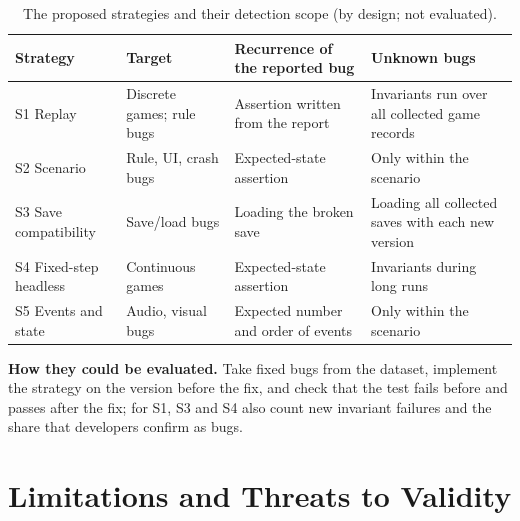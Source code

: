 \documentclass[10pt,twocolumn,a4paper]{article}
\newcommand{\para}[1]{\par\smallskip\noindent\textbf{#1}\enspace}
\begin{document}
\begin{table}[tb]
\centering
\caption{The proposed strategies and their detection scope (by design; not evaluated).}\label{tab:detect}
\small
\begin{tabularx}{\textwidth}{@{}P{34mm}P{30mm}LL@{}}
\toprule
Strategy & Target & Recurrence of the reported bug & Unknown bugs\\
\midrule
S1 Replay & Discrete games; rule bugs & Assertion written from the report & Invariants run over all collected game records\\
S2 Scenario & Rule, UI, crash bugs & Expected-state assertion & Only within the scenario\\
S3 Save compatibility & Save/load bugs & Loading the broken save & Loading all collected saves with each new version\\
S4 Fixed-step headless & Continuous games & Expected-state assertion & Invariants during long runs\\
S5 Events and state & Audio, visual bugs & Expected number and order of events & Only within the scenario\\
\bottomrule
\end{tabularx}
\end{table}

\para{How they could be evaluated.}
Take fixed bugs from the dataset, implement the strategy on the version before the fix, and check that the test fails before and passes after the fix; for S1, S3 and S4 also count new invariant failures and the share that developers confirm as bugs.

\section{Limitations and Threats to Validity}\label{sec:limitations}
\end{document}
